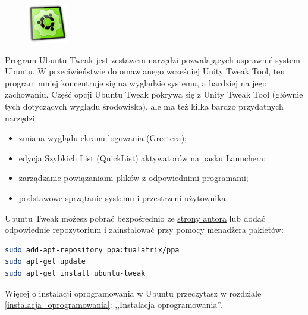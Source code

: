 \begin{figure}
	\vspace{-10pt}
	\includegraphics[width=\linewidth]{images/ikony_ubuntutweak.png}
\end{figure}

Program \textcolor{ubuntu_orange}{Ubuntu Tweak} jest zestawem narzędzi pozwalających usprawnić system Ubuntu. W przeciwieństwie do omawianego wcześniej Unity Tweak Tool, ten program mniej koncentruje się na wyglądzie systemu, a bardziej na jego zachowaniu. Część opcji Ubuntu Tweak pokrywa się z Unity Tweak Tool (głównie tych dotyczących wyglądu środowiska), ale ma też kilka bardzo przydatnych narzędzi:

\begin{itemize}
\item {} zmiana wyglądu ekranu logowania (Greetera);
\item {} edycja Szybkich List (QuickList) aktywatorów na pasku Launchera;
\item {} zarządzanie powiązaniami plików z odpowiednimi programami;
\item {} podstawowe sprzątanie systemu i przestrzeni użytownika.
\end{itemize}

Ubuntu Tweak możesz pobrać bezpośrednio ze \href{http://ubuntu-tweak.com/}{strony autora} lub dodać odpowiednie repozytorium i zainstalować przy pomocy menadżera pakietów:
\begin{lstlisting}[language=bash]
sudo add-apt-repository ppa:tualatrix/ppa
sudo apt-get update
sudo apt-get install ubuntu-tweak
\end{lstlisting}

Więcej o instalacji oprogramowania w Ubuntu przeczytasz w rozdziale \ref{instalacja_oprogramowania}: ,,Instalacja oprogramowania''.
